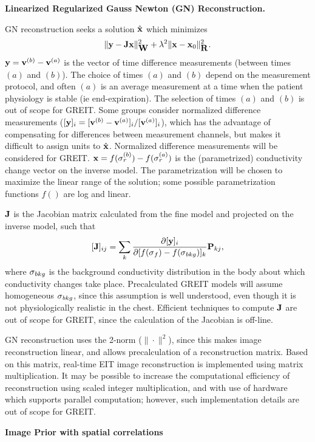 \documentclass[letterpaper,twocolumn,10pt]{article}
\newcommand{\vB}{\mbox{$\bf v$}}
\newcommand{\xB}{\mbox{$\bf x$}}
\newcommand{\yB}{\mbox{$\bf y$}}
\newcommand{\JB}{\mbox{$\bf J$}}
\newcommand{\RB}{\mbox{$\bf R$}}
\newcommand{\WB}{\mbox{$\bf W$}}
\newcommand{\PB}{\mbox{$\bf P$}}
\newcommand{\sG}{\mbox{$\bf \sigma$}}
\begin{document}
\begin{list}{\bf {}.}
\item {\bf Linearized Regularized Gauss Newton (GN) Reconstruction.}

GN reconstruction seeks a solution $\hat{\xB}$ which minimizes
$$\| \yB - \JB \xB \|^2_{\WB} + \lambda^2\|\xB - \xB_0\|^2_{\RB}.$$
$\yB = \vB^{(b)} - \vB^{(a)}$ is the vector of
time difference measurements (between times $(a)$ and $(b)$).
The choice of times $(a)$ and $(b)$ depend on the measurement
protocol, and often $(a)$ is an average measurement at a time when
the patient physiology is stable (ie end-expiration). The selection
of times $(a)$ and $(b)$ is out of scope for GREIT.
Some groups consider normalized difference measurements
($[\yB]_i = [\vB^{(b)} - \vB^{(a)}]_i / [\vB^{(a)}]_i$), which
has the advantage of compensating for differences between measurement
channels, but makes it difficult to assign units to $\hat{\xB}$. 
Normalized difference measurements will be considered for GREIT.
$\xB = f(\sG^{(b)}_r) - f(\sG^{(a)}_r)$ is the (parametrized) 
conductivity change vector on the inverse model.
The parametrization will be
chosen to maximize the linear range of the solution; 
some possible parametrization functions $f()$ are log and linear.

$\JB$ is the Jacobian matrix calculated from the 
fine model and projected on the inverse model,
such that 
$$[\JB]_{ij} = \sum_k \frac{\partial [\yB ]_i}
                           {\partial [ f(\sG_f) - f(\sG_{bkg}) ]_k}
                           \PB_{kj} ,$$ 
where $\sG_{bkg}$ is the background conductivity distribution in 
the body about which conductivity changes take place. Precalculated
GREIT models will assume homogeneous $\sG_{bkg}$, since this
assumption is well understood, even though it is not
physiologically realistic in the chest. Efficient techniques
to compute $\JB$ are out of scope for GREIT, since the calculation
of the Jacobian is off-line.

GN reconstruction uses the 2-norm ($\| \cdot \|^2$), since this
makes image reconstruction linear, and allows precalculation
of a reconstruction matrix. Based on this matrix, real-time
EIT image reconstruction is implemented using matrix multiplication.
It may be possible to increase the computational efficiency
of reconstruction using scaled integer multiplication,
and with use of hardware which supports parallel computation;
however, such implementation details are out of scope for GREIT.

\item {\bf Image Prior with spatial correlations}


\end{list}
\end{document}
